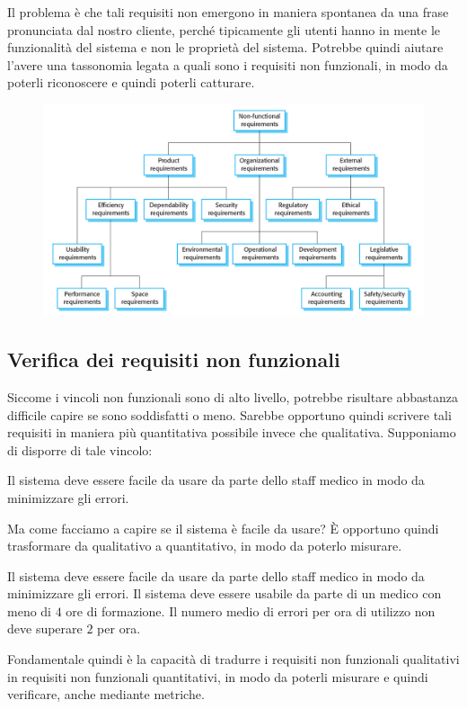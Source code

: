 Il problema è che tali requisiti non emergono in maniera spontanea da una frase pronunciata dal 
nostro cliente, perché tipicamente gli utenti hanno in mente le funzionalità del sistema
e non le proprietà del sistema. Potrebbe quindi aiutare l'avere una tassonomia legata a 
quali sono i requisiti non funzionali, in modo da poterli riconoscere e quindi
poterli catturare.
\begin{figure}[H]
    \centering
    \includegraphics[scale=0.4]{img/nonfunctional.png}
\end{figure}
\subsection{Verifica dei requisiti non funzionali}
Siccome i vincoli non funzionali sono di alto livello, potrebbe risultare abbastanza difficile 
capire se sono soddisfatti o meno. Sarebbe opportuno quindi scrivere tali requisiti in maniera più 
quantitativa possibile invece che qualitativa. 
Supponiamo di disporre di tale vincolo:
\begin{tcolorbox}
    Il sistema deve essere facile da usare da parte dello staff medico in modo da minimizzare gli errori.
\end{tcolorbox}
Ma come facciamo a capire se il sistema è facile da usare? È opportuno quindi
trasformare da qualitativo a quantitativo, in modo da poterlo misurare.
\begin{tcolorbox}
    Il sistema deve essere facile da usare da parte dello staff medico in modo da minimizzare gli errori. 
    Il sistema deve essere usabile da parte di un medico con meno di $4$ ore di formazione.
    Il numero medio di errori per ora di utilizzo non deve superare $2$ per ora.
\end{tcolorbox}
Fondamentale quindi è la capacità di tradurre i requisiti non funzionali qualitativi in 
requisiti non funzionali quantitativi, in modo da poterli misurare e quindi verificare, anche mediante 
metriche.

